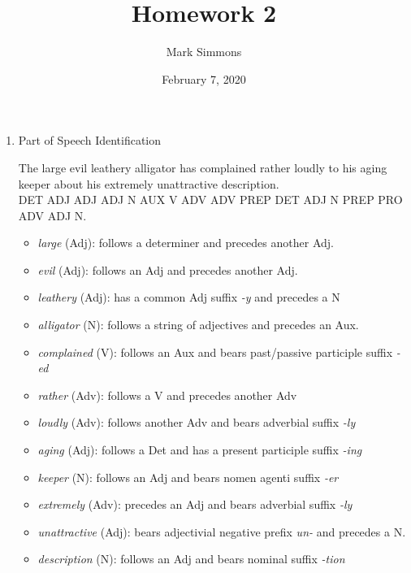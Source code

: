 \documentclass[12pt]{article}
\title{Homework 2}
\author{Mark Simmons}
\date{February 7, 2020}
\begin{document}
\maketitle

\begin{enumerate}

\item Part of Speech Identification
\begin{exe}
\ex\label{ex1}
\gll
The large evil leathery alligator has complained rather loudly to his aging keeper about his extremely unattractive description.\\
DET ADJ ADJ ADJ N AUX V ADV ADV PREP DET ADJ N PREP PRO ADV ADJ N.\\
\end{exe}


\begin{itemize}

\item \emph{large} (Adj): follows a determiner and precedes another Adj.
\item \emph{evil} (Adj): follows an Adj and precedes another Adj.
\item \emph{leathery} (Adj): has a common Adj suffix \emph{-y} and precedes a N
\item \emph{alligator} (N): follows a string of adjectives and precedes an Aux.
\item \emph{complained} (V): follows an Aux and bears past/passive participle suffix \emph{-ed}
\item \emph{rather} (Adv): follows a V and precedes another Adv
\item \emph{loudly} (Adv): follows another Adv and bears adverbial suffix \emph{-ly}
\item \emph{aging} (Adj): follows a Det and has a present participle suffix \emph{-ing}
\item \emph{keeper} (N): follows an Adj and bears nomen agenti suffix \emph{-er}
\item \emph{extremely} (Adv): precedes an Adj and bears adverbial suffix \emph{-ly}
\item \emph{unattractive} (Adj): bears adjectivial negative prefix \emph{un-} and precedes a N.
\item \emph{description} (N): follows an Adj and bears nominal suffix \emph{-tion}

\end{itemize}


\end{enumerate}
\end{document}
